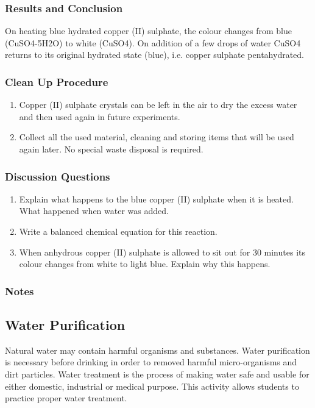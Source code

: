\subsubsection*{Results and Conclusion}
On heating blue hydrated copper (II) sulphate, the colour changes from blue (CuSO4-5H2O) to white (CuSO4). On addition of a few drops of water CuSO4 returns to its original hydrated state (blue), i.e. copper sulphate pentahydrated.

\subsubsection*{Clean Up Procedure}
\begin{enumerate}
\item{Copper (II) sulphate crystals can be left in the air to dry the excess water and then used again in future experiments.}
\item{Collect all the used material, cleaning and storing items that will be used again later. No special waste disposal is required.}
\end{enumerate}

\subsubsection*{Discussion Questions}
\begin{enumerate}
\item{Explain what happens to the blue copper (II) sulphate when it is heated. What happened when water was added.}
\item{Write a balanced chemical equation for this reaction.}
\item{When anhydrous copper (II) sulphate is allowed to sit out for 30 minutes its colour changes from white to light blue. Explain why this happens.}
\end{enumerate}

\subsubsection*{Notes}

\subsection{Water Purification}

Natural water may contain harmful organisms and substances. Water purification is necessary before drinking in order to removed harmful micro-organisms and dirt particles. Water treatment is the process of making water safe and usable for either domestic, industrial or medical purpose. This activity allows students to practice proper water treatment.



